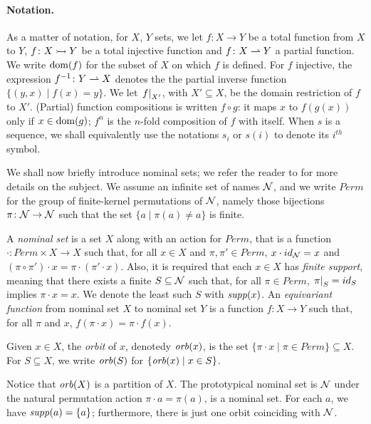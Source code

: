 \paragraph{Notation.} As a matter of notation, for $X$, $Y$ sets, we let $f \colon X \to Y$ be a total function from $X$ to $Y$, $f \colon X \rightarrowtail Y$ be a total injective function and $f \colon X \rightharpoonup Y$ a partial function. We write $\operatorname{dom}(f)$ for the subset of $X$ on which $f$ is defined. For $f$ injective, the expression $f^{-1} \colon Y \rightharpoonup X$ denotes the the partial inverse function $\{(y,x) \mid f(x) = y \}$. We let $\left.f\right|_{X'}$, with $X' \subseteq X$, be the domain restriction of $f$ to $X'$. (Partial) function compositions is written $f \circ g$: it maps $x$ to $f(g(x))$ only if $x \in \operatorname{dom}(g)$; $f^n$ is the $n$-fold composition of $f$ with itself. When $s$ is a sequence, we shall equivalently use the notations $s_i$ or $s(i)$ to denote its $i^{\mathit{th}}$ symbol.

We shall now briefly introduce nominal sets; we refer the reader to \cite{GabbayPitts?} for more details on the subject. We assume an infinite set of names $\mathcal{N}$, and we write $Perm$ for the group of finite-kernel permutations of $\mathcal{N}$, namely those bijections $\pi \colon \mathcal{N} \to \mathcal{N}$ such that the set $\{ a \mid \pi(a) \neq a \}$ is finite.
\begin{definition}
A \emph{nominal set} is a set $X$ along with an action for $Perm$, that is a function $\cdot \colon Perm \times X \to X$ such that, for all $x \in X$ and $\pi,\pi' \in Perm$, $x \cdot id_{\mathcal{N}} = x$ and $(\pi \circ \pi') \cdot x = \pi \cdot (\pi' \cdot x)$. Also, it is required that each $x \in X$ has \emph{finite support}, meaning that there exists a finite $S \subseteq \mathcal{N}$ such that, for all $\pi \in Perm$, $\left.\pi\right|_{S} = id_S$ implies $\pi \cdot x = x$. We denote the least such $S$ with $\mathit{supp}(x)$. An \emph{equivariant function} from nominal set $X$ to nominal set $Y$ is a function $f : X \to Y$ such that, for all $\pi$ and $x$, $f(\pi \cdot x) = \pi \cdot f(x)$.
\end{definition}
%
\begin{definition}
Given $x \in X$, the \emph{orbit} of $x$, denotedy $\mathit{orb}(x) $, is the set $\{ \pi \cdot x \mid \pi \in Perm\} \subseteq X$. For $S \subseteq X$, we write $\mathit{orb}(S)$ for $\{ \mathit{orb}(x) \mid x \in S\}$. 
\end{definition}

Notice that $\mathit{orb}(X)$ is a partition of $X$. The prototypical nominal set is $\mathcal{N}$ under the natural permutation action $\pi \cdot a = \pi(a)$, is a nominal set. For each $a$, we have $\mathit{supp}(a) = \{a\}$; furthermore, there is just one orbit coinciding with $\mathcal{N}$.
